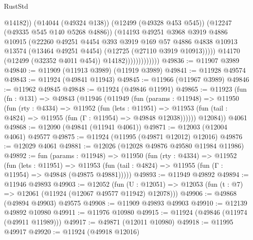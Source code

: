\begin{lexlean}{RustStd}
\begin{coremodule}
                                    @14182))
                                (@14044 (@49324 @138))
                                (@12499 (@49328 @453 @545))
                                (@12247 (@49335 @545 @140 @5268 @4886))
                                (@14193
                                  @49251
                                  @3968
                                  @3919
                                  @4886
                                  @10915
                                  (@22260
                                    @49251
                                    @4454
                                    @393
                                    @3919
                                    @169
                                    @57
                                    @4886
                                    @4838
                                    @10913
                                    @13574
                                    (@13464 @49251 @4454)
                                    (@12725 (@27110 @3919 @10913)))))
                              @14170
                              (@12499 (@32352 @4011 @454))
                              @14182)))))))))))))
@49836 := @11907 @3989
@49840 := @11909 (@11913 @3989) (@11919 @3989)
@49841 := @11928 @49574
@49843 := @11924 (@49841 @11943)
@49845 := @11966 (@11967 @3989)
@49846 := @11962 @49845
@49848 := @11924 (@49846 @11991)
@49865 := @11923
    (fun (fn : @131) =>
    @49843
      (@11946
        (@11949
          (fun (params : @11948) =>
          @11950
            (fun (rty : @4334) =>
            @11952
              (fun (lets : @11951) =>
              @11953 (fun (tail : @4824) => @11955 (fun (Γ : @11954) => @49848 @12038))))))
        @12084))
    @4061
@49868 := @12090 (@49841 (@11941 @4061))
@49871 := @12003 (@12004 @4061) @49577
@49875 := @11924 (@11995 (@49871 @12012) @12016)
@49876 := @12029 @4061
@49881 := @12026 (@12028 @49876 @49580 @11984 @11986)
@49892 := fun (params : @11948) =>
  @11950
    (fun (rty : @4334) =>
    @11952
      (fun (lets : @11951) =>
      @11953 (fun (tail : @4824) => @11955 (fun (Γ : @11954) => @49848 (@49875 @49881)))))
@49893 := @11949 @49892
@49894 := @11946 @49893
@49903 := @12052
    (fun (U : @12051) => @12053 (fun (t : @7) => @12061 (@11924 (@12067 @49577 @11942) @12078)))
@49906 := @49868 (@49894 @49903) @49575
@49908 := @11909 @49893 @49903
@49910 := @12139 @49892 @10980
@49911 := @11976 @10980
@49915 := @11924 (@49846 (@11974 (@49911 @11989)))
@49917 := @49871 (@12011 @10980)
@49918 := @11995 @49917
@49920 := @11924 (@49918 @12016)

\end{coremodule}
\end{lexlean}
